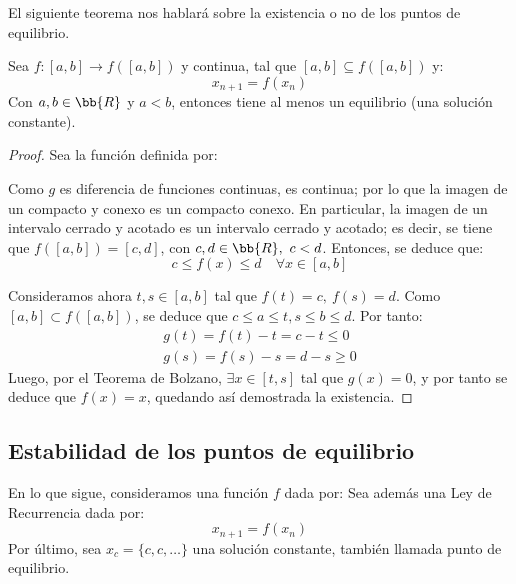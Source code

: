El siguiente teorema nos hablará sobre la existencia o no de los puntos de equilibrio.
\begin{teo}
    Sea $f:[a,b] \to f([a,b])$ y continua, tal que $[a,b]\subseteq f([a,b])$ y:
    \begin{equation*}
        x_{n+1} = f(x_n)
    \end{equation*}
    Con $a, b \in \bb{R}$ y $a<b$, entonces tiene al menos un equilibrio (una solución constante).
\end{teo}
\begin{proof}
    Sea la función definida por:

    Como $g$ es diferencia de funciones continuas, es continua; por lo que la imagen de un compacto y conexo es un compacto conexo. En particular, la imagen de un intervalo cerrado y acotado es un intervalo cerrado y acotado; es decir, se tiene que $f([a,b])=[c,d]$, con $c,d\in \bb{R},~c<d$. Entonces, se deduce que:
    \begin{equation*}
        c\leq f(x) \leq d\quad \forall x \in [a,b]
    \end{equation*}

    Consideramos ahora $t,s\in [a,b]$ tal que $f(t)=c,~f(s)=d$. Como $[a,b]\subset f([a,b])$, se deduce que $c\leq a\leq t,s\leq b\leq d$. Por tanto:
    \begin{gather*}
        g(t) = f(t) -t = c-t\leq 0 \\
        g(s) = f(s) -s = d-s\geq 0
    \end{gather*}
    Luego, por el Teorema de Bolzano, $\exists x \in [t,s]$ tal que $g(x) = 0$, y por tanto se deduce que $f(x)=x$, quedando así demostrada la existencia.
\end{proof}


\subsection{Estabilidad de los puntos de equilibrio}\label{sec:estabilidad_eq}
\begin{notacion}
    En lo que sigue, consideramos una función $f$ dada por: 
    Sea además una Ley de Recurrencia dada por:
    \begin{equation*}
        x_{n+1} = f(x_n)
    \end{equation*}
    Por último, sea $x_c = \{c,c,\ldots \}$ una solución constante, también llamada punto de equilibrio.
\end{notacion}

